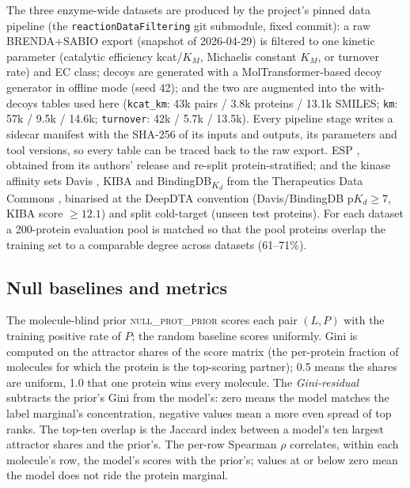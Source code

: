 \documentclass[11pt,a4paper]{article}
\newcommand{\nullprior}{\textsc{null\_prot\_prior}\xspace}
\begin{document}
The three enzyme-wide datasets are produced by the project's pinned data
pipeline (the \texttt{reactionDataFiltering} git submodule, fixed commit):
a raw BRENDA+SABIO export (snapshot of 2026-04-29) is filtered to one
kinetic parameter (catalytic efficiency kcat/$K_M$, Michaelis constant
$K_M$, or turnover rate) and EC class; decoys are generated with a
MolTransformer-based decoy generator in offline mode (seed 42); and the two
are augmented into the with-decoys tables used here (\texttt{kcat\_km}:
43k pairs / 3.8k proteins / 13.1k SMILES; \texttt{km}: 57k / 9.5k / 14.6k;
\texttt{turnover}: 42k / 5.7k / 13.5k). Every pipeline stage writes a
sidecar manifest with the SHA-256 of its inputs and outputs, its parameters
and tool versions, so every table can be traced back to the raw export.
ESP \citep{kroll2023esp}, obtained
from its authors' release and re-split protein-stratified; and the kinase
affinity sets Davis \citep{davis2011kinase}, KIBA \citep{tang2014kiba} and
BindingDB\textsubscript{$K_d$} from the Therapeutics Data Commons
\citep{huang2021tdc}, binarised at the DeepDTA convention
\citep{ozturk2018deepdta} (Davis/BindingDB $\text{p}K_d \geq 7$, KIBA score
$\geq 12.1$) and split cold-target (unseen test proteins). For each dataset
a 200-protein evaluation pool is matched so that the pool proteins overlap
the training set to a comparable degree across datasets (61--71\%).

\subsection{Null baselines and metrics}
\label{sec:metrics}

The molecule-blind prior \nullprior{} scores each pair $(L, P)$ with the
training positive rate of $P$; the random baseline scores uniformly. Gini is
computed on the attractor shares of the score matrix (the per-protein
fraction of molecules for which the protein is the top-scoring partner);
0.5 means the shares are uniform, 1.0 that one protein wins every molecule.
The \emph{Gini-residual} subtracts the prior's Gini from the model's:
zero means the model matches the label marginal's concentration, negative
values mean a more even spread of top ranks.
The top-ten overlap is the Jaccard index between a model's ten largest
attractor shares and the prior's. The per-row Spearman $\rho$ correlates,
within each molecule's row,
the model's scores with the prior's; values at or below zero mean the model
does not ride the protein marginal.
\end{document}
